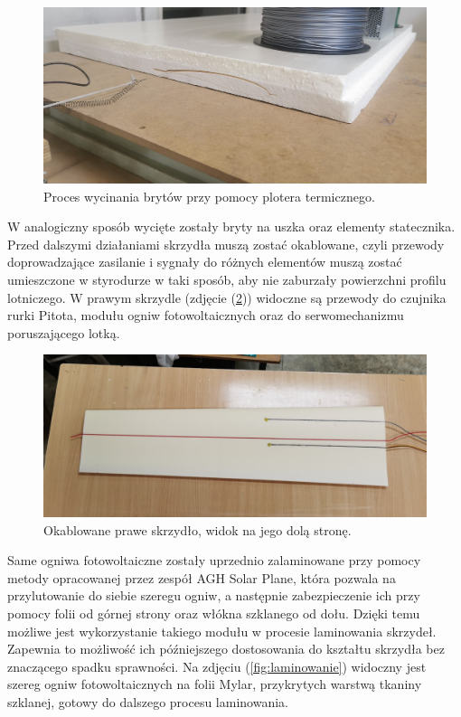 \documentclass[12pt, a4paper]{article}
\let\oldref\ref
\renewcommand{\ref}[1]{(\oldref{#1})}
\begin{document}
\begin{figure}[ht]
    \centering
    \includegraphics[width=1\textwidth]{budowa5}
    \caption{Proces wycinania brytów przy pomocy plotera termicznego.}
    \label{fig:ploter}
\end{figure}
 
W analogiczny sposób wycięte zostały bryty na uszka oraz elementy statecznika. Przed dalszymi działaniami skrzydła muszą zostać okablowane, czyli przewody doprowadzające zasilanie i sygnały do różnych elementów muszą zostać umieszczone w styrodurze w taki sposób, aby nie zaburzały powierzchni profilu lotniczego. W prawym skrzydle (zdjęcie \ref{fig:okablowane}) widoczne są przewody do czujnika rurki Pitota, modułu ogniw fotowoltaicznych oraz do serwomechanizmu poruszającego lotką.

 \begin{figure}[ht]
    \centering
    \includegraphics[width=1\textwidth]{okablowany}
    \caption{Okablowane prawe skrzydło, widok na jego dolą stronę.}
    \label{fig:okablowane}
\end{figure}

Same ogniwa fotowoltaiczne zostały uprzednio zalaminowane przy pomocy metody opracowanej przez zespół AGH Solar Plane, która pozwala na przylutowanie do siebie szeregu ogniw, a następnie zabezpieczenie ich przy pomocy folii od górnej strony oraz włókna szklanego od dołu. Dzięki temu możliwe jest wykorzystanie takiego modułu w procesie laminowania skrzydeł. Zapewnia to możliwość ich późniejszego dostosowania do kształtu skrzydła bez znaczącego spadku sprawności. Na zdjęciu \ref{fig:laminowanie} widoczny jest szereg ogniw fotowoltaicznych na folii Mylar, przykrytych warstwą tkaniny szklanej, gotowy do dalszego procesu laminowania.
\end{document}

